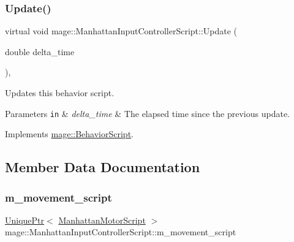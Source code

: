 \hypertarget{classmage_1_1_manhattan_input_controller_script_adfd98377642722fae5db6e005b2c6c3e}{}\label{classmage_1_1_manhattan_input_controller_script_adfd98377642722fae5db6e005b2c6c3e} 
\subsubsection{\texorpdfstring{Update()}{Update()}}
{\footnotesize\ttfamily virtual void mage\+::\+Manhattan\+Input\+Controller\+Script\+::\+Update (\begin{DoxyParamCaption}\item[{double}]{delta\+\_\+time }\end{DoxyParamCaption})\hspace{0.3cm}{\ttfamily [override]}, {\ttfamily [virtual]}}

Updates this behavior script.


\begin{DoxyParams}[1]{Parameters}
\mbox{\tt in}  & {\em delta\+\_\+time} & The elapsed time since the previous update. \\
\hline
\end{DoxyParams}


Implements \hyperlink{classmage_1_1_behavior_script_a905b6c83640cb91d19fecab3435f6feb}{mage\+::\+Behavior\+Script}.



\subsection{Member Data Documentation}
\hypertarget{classmage_1_1_manhattan_input_controller_script_ad3b6525bba021f03c17d2de6f5e54101}{}\label{classmage_1_1_manhattan_input_controller_script_ad3b6525bba021f03c17d2de6f5e54101} 
\subsubsection{\texorpdfstring{m\+\_\+movement\+\_\+script}{m\_movement\_script}}
{\footnotesize\ttfamily \hyperlink{namespacemage_a8c307fbcc33bce9b7f2aa4c26c3b95cf}{Unique\+Ptr}$<$ \hyperlink{classmage_1_1_manhattan_motor_script}{Manhattan\+Motor\+Script} $>$ mage\+::\+Manhattan\+Input\+Controller\+Script\+::m\+\_\+movement\+\_\+script\hspace{0.3cm}{\ttfamily [private]}}


